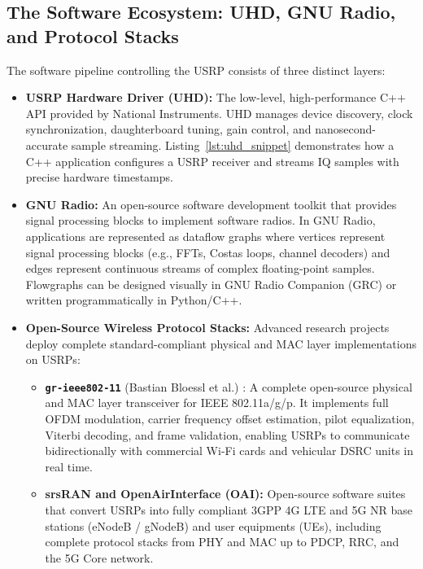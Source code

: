 \subsection{The Software Ecosystem: UHD, GNU Radio, and Protocol Stacks}
The software pipeline controlling the USRP consists of three distinct layers:
\begin{itemize}
    \item \textbf{USRP Hardware Driver (UHD):} The low-level, high-performance C++ API provided by National Instruments. UHD manages device discovery, clock synchronization, daughterboard tuning, gain control, and nanosecond-accurate sample streaming. Listing~\ref{lst:uhd_snippet} demonstrates how a C++ application configures a USRP receiver and streams IQ samples with precise hardware timestamps.
    \item \textbf{GNU Radio:} An open-source software development toolkit that provides signal processing blocks to implement software radios. In GNU Radio, applications are represented as dataflow graphs where vertices represent signal processing blocks (e.g., FFTs, Costas loops, channel decoders) and edges represent continuous streams of complex floating-point samples. Flowgraphs can be designed visually in GNU Radio Companion (GRC) or written programmatically in Python/C++.
    \item \textbf{Open-Source Wireless Protocol Stacks:} Advanced research projects deploy complete standard-compliant physical and MAC layer implementations on USRPs:
    \begin{itemize}
        \item \textbf{\texttt{gr-ieee802-11}} (Bastian Bloessl et al.) \cite{bloessl2013ieee}: A complete open-source physical and MAC layer transceiver for IEEE 802.11a/g/p. It implements full OFDM modulation, carrier frequency offset estimation, pilot equalization, Viterbi decoding, and frame validation, enabling USRPs to communicate bidirectionally with commercial Wi-Fi cards and vehicular DSRC units in real time.
        \item \textbf{srsRAN and OpenAirInterface (OAI):} Open-source software suites that convert USRPs into fully compliant 3GPP 4G LTE and 5G NR base stations (eNodeB / gNodeB) and user equipments (UEs), including complete protocol stacks from PHY and MAC up to PDCP, RRC, and the 5G Core network.
    \end{itemize}
\end{itemize}

